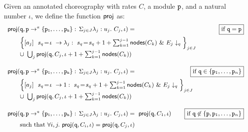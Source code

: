 \begin{definition}\label{def:projCTMC} Given an
  annotated choreography with rates $C$, a module $\mathtt{p}$, and a
  natural number $\iota$, we define the function $\mathsf{proj}$ as:
  \begin{displaymath}\small
        \begin{array}{lr}

          \proj (\role q,\interactl{p}{a}{\role p_1,\ldots,\role p_n}, \iota)= 
          &  \boxed{\text{if }\role q=\role p}\\[2mm]
          \qquad
          \Big\{\commandBase {a_j} {\ s_{q}\!=\! \iota} {\lambda_j:\ s_{q}\!=\!
          s_{q} +1+\sum_{k=1}^{j-1}\mathsf{nodes}({C_k})}\ \&\ \projE
          {E_j}q\Big\}_{j\in J}
          \\
          \qquad\cup\ \bigcup_{j} \proj (\role q, C_j, \iota+1+\sum_{k=1}^{j-1}\mathsf{nodes}({C_k}))
          \\\\

          \proj (\role q,\interactl{p}{a}{\role p_1,\ldots,\role p_n}, \iota)= 
          &  \!\!\!\!\!\! \!\!\!\!\!\!\boxed{\text{if }\role q\in\{\role p_1,\ldots,\role p_n\}}\\[2mm]
          \qquad
          \Big\{\commandBase {a_j} {\ s_{q}\!=\! \iota} {1:\ s_{q}\!=\!
          s_{q} +1+\sum_{k=1}^{j-1}\mathsf{nodes}({C_k})}\ \&\ \projE
          {E_j}q\Big\}_{j\in J}
          \\
          \qquad\cup\ \bigcup_{j} \proj (\role q, C_j, \iota+1+\sum_{k=1}^{j-1}\mathsf{nodes}({C_k}))
          \\\\

          \proj (\role q,\interactl{p}a{\role p_1,\ldots,\role p_n}, \iota)=\ \proj (\role{q}, C_1, \iota)
          &  \hspace{-1.8cm}\boxed{\text{if }\role q\not\in\{\role p, 
            \role p_1,\ldots,\role p_n\}}
          \\[2mm]
          \qquad\text{such that } \forall i,j.\ \proj (\role{q}, C_i, \iota)= \proj (\role{q}, C_j, \iota)
          \\\\


\end{array}
\end{displaymath}
\end{definition}
